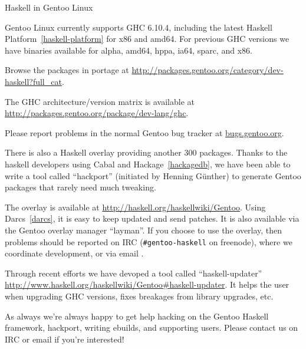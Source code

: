 \begin{hcarentry}[updated]{Haskell in Gentoo Linux}
\label{gentoo}
\makeheader

Gentoo Linux currently supports GHC 6.10.4, including the
latest Haskell Platform~\cref{haskell-platform} for x86 and amd64.
For previous GHC versions we have binaries available for alpha, amd64, hppa,
ia64, sparc, and x86.

Browse the packages in portage at 
\url{http://packages.gentoo.org/category/dev-haskell?full\_cat}.

The GHC architecture/version matrix is available at
\url{http://packages.gentoo.org/package/dev-lang/ghc}.

Please report problems in the normal Gentoo bug tracker
at \url{bugs.gentoo.org}.

There is also a Haskell overlay providing another 300 packages. Thanks to
the haskell developers using Cabal and Hackage~\cref{hackagedb}, we have been
able to write a tool called ``hackport'' (initiated by Henning G\"unther) to
generate Gentoo packages that rarely need much tweaking.

The overlay is available at
\url{http://haskell.org/haskellwiki/Gentoo}. Using
Darcs~\cref{darcs}, it is easy to keep updated and send patches.
It is also available via the Gentoo overlay manager ``layman''.
If you choose to use the overlay, then problems should be
reported on
IRC (\verb+#gentoo-haskell+ on freenode), where we coordinate
development, or via email .

Through recent efforts we have devoped a tool called ``haskell-updater''
\url{http://www.haskell.org/haskellwiki/Gentoo#haskell-updater}.
It helps the user when upgrading GHC versions, fixes
breakages from library upgrades, etc.

As always we're always happy to get help hacking on the Gentoo Haskell
framework, hackport, writing ebuilds, and supporting users. Please contact
us on IRC or email if you're interested!
\end{hcarentry}
